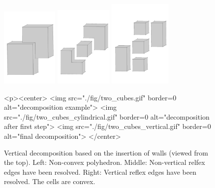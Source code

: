 \begin{figure}[h]
  \begin{ccTexOnly}
    \begin{center}
      \includegraphics[width=0.245\textwidth]{Convex_decomposition_3/fig/two_cubes} \hspace{4mm}
      \includegraphics[width=0.25\textwidth]{Convex_decomposition_3/fig/two_cubes_cylindrical} \hspace{1mm}
      \includegraphics[width=0.27\textwidth]{Convex_decomposition_3/fig/two_cubes_vertical}
    \end{center}
  \end{ccTexOnly}
  \begin{ccHtmlOnly}
    <p><center>
    <img src="./fig/two_cubes.gif" border=0 alt="decomposition
    example">
    <img src="./fig/two_cubes_cylindrical.gif" border=0 alt="decomposition
    after first step">
    <img src="./fig/two_cubes_vertical.gif" border=0 alt="final decomposition">
    </center>
  \end{ccHtmlOnly}
  \caption{Vertical decomposition based on the insertion of walls 
	   (viewed from the top). Left: Non-convex polyhedron. Middle:
	   Non-vertical relfex edges have been resolved. Right: Vertical
           reflex edges have been resolved. The cells are convex.}
  \label{fig:verticalDecomposition}
\end{figure}

